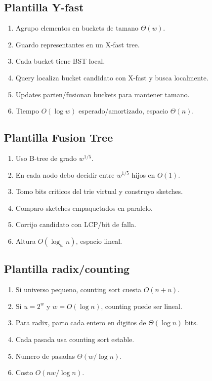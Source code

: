 \documentclass[10pt]{article}
\newcommand{\bigO}{O}
\begin{document}
\subsection{Plantilla Y-fast}
\begin{enumerate}[leftmargin=*]
\item Agrupo elementos en buckets de tamano $\Theta(w)$.
\item Guardo representantes en un X-fast tree.
\item Cada bucket tiene BST local.
\item Query localiza bucket candidato con X-fast y busca localmente.
\item Updates parten/fusionan buckets para mantener tamano.
\item Tiempo $\bigO(\log w)$ esperado/amortizado, espacio $\Theta(n)$.
\end{enumerate}

\subsection{Plantilla Fusion Tree}
\begin{enumerate}[leftmargin=*]
\item Uso B-tree de grado $w^{1/5}$.
\item En cada nodo debo decidir entre $w^{1/5}$ hijos en $\bigO(1)$.
\item Tomo bits criticos del trie virtual y construyo sketches.
\item Comparo sketches empaquetados en paralelo.
\item Corrijo candidato con LCP/bit de falla.
\item Altura $\bigO(\log_w n)$, espacio lineal.
\end{enumerate}

\subsection{Plantilla radix/counting}
\begin{enumerate}[leftmargin=*]
\item Si universo pequeno, counting sort cuesta $\bigO(n+u)$.
\item Si $u=2^w$ y $w=\bigO(\log n)$, counting puede ser lineal.
\item Para radix, parto cada entero en digitos de $\Theta(\log n)$ bits.
\item Cada pasada usa counting sort estable.
\item Numero de pasadas $\Theta(w/\log n)$.
\item Costo $\bigO(nw/\log n)$.
\end{enumerate}
\end{document}
